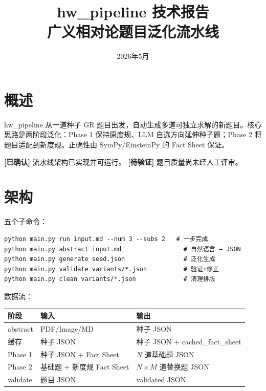 \documentclass[12pt,a4paper]{article}
\title{\textbf{hw\_pipeline 技术报告}\\广义相对论题目泛化流水线}
\author{}
\date{2026年5月}
\newcommand{\certain}[1]{{\color{certcolor}\textbf{[已确认]}} #1}
\newcommand{\uncertain}[1]{{\color{uncertcolor}\textbf{[待验证]}} #1}
\begin{document}
\maketitle
\tableofcontents
\newpage

\section{概述}

hw\_pipeline 从一道种子 GR 题目出发，自动生成多道可独立求解的新题目。核心思路是两阶段泛化：Phase 1 保持原度规、LLM 自选方向延伸种子题；Phase 2 将题目适配到新度规。正确性由 SymPy/EinsteinPy 的 Fact Sheet 保证。

\certain{流水线架构已实现并可运行。} \uncertain{题目质量尚未经人工评审。}

\section{架构}

五个子命令：

\begin{lstlisting}
python main.py run input.md --num 3 --subs 2   # 一步完成
python main.py abstract input.md                 # 自然语言 → JSON
python main.py generate seed.json                # 泛化生成
python main.py validate variants/*.json          # 验证+修正
python main.py clean variants/*.json             # 清理排版
\end{lstlisting}

数据流：

\begin{center}
\begin{tabular}{lll}
\toprule
阶段 & 输入 & 输出 \\
\midrule
abstract & PDF/Image/MD & 种子 JSON \\
缓存 & 种子 JSON & 种子 JSON + cached\_fact\_sheet \\
Phase 1 & 种子 JSON + Fact Sheet & $N$ 道基础题 JSON \\
Phase 2 & 基础题 + 新度规 Fact Sheet & $N \times M$ 道替换题 JSON \\
validate & 题目 JSON & validated JSON \\
\bottomrule
\end{tabular}
\end{center}
\end{document}
